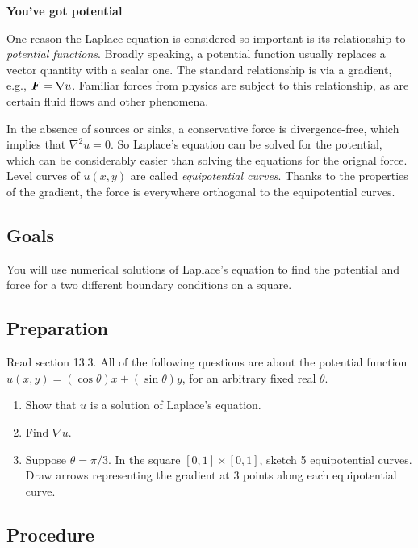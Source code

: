 \documentclass[11pt,twoside]{article}
\begin{document}
\begin{center}
  \bf You've got potential
\end{center}

One reason the Laplace equation is considered so important is its relationship to \emph{potential functions}. Broadly speaking, a potential function usually replaces a vector quantity with a scalar one. The standard relationship is via a gradient, e.g., $\bm{F}=\nabla u$. Familiar forces from physics are subject to this relationship, as are certain fluid flows and other phenomena. 

In the absence of sources or sinks, a conservative force is divergence-free, which implies that $\nabla^2 u=0$. So Laplace's equation can be solved for the potential, which can be considerably easier than solving the equations for the orignal force. Level curves of $u(x,y)$ are called \emph{equipotential curves}. Thanks to the properties of the gradient, the force is everywhere orthogonal to the equipotential curves. 

\subsection*{Goals}

You will use numerical solutions of Laplace's equation to find the potential and force for a two different boundary conditions on a square.

\subsection*{Preparation}

Read section 13.3. All of the following questions are about the potential function $u(x,y)=(\cos \theta)x + (\sin \theta)y$, for an arbitrary fixed real $\theta$.
\begin{enumerate}
\item Show that $u$ is a solution of Laplace's equation.
\item Find $\nabla u$.
\item Suppose $\theta=\pi/3$. In the square $[0,1]\times[0,1]$, sketch 5 equipotential curves. Draw arrows representing the gradient at 3 points along each equipotential curve. 
\end{enumerate}

\subsection*{Procedure}
\end{document}
